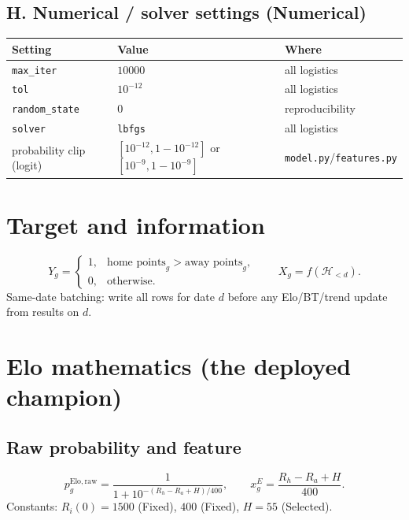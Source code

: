 \documentclass[10pt]{article}
\newcommand{\cls}[1]{\textbf{#1}}
\newcommand{\code}[1]{\texttt{#1}}
\begin{document}
\subsection{H. Numerical / solver settings (\cls{Numerical})}

\begin{longtable}{@{}lll@{}}
\toprule
\textbf{Setting} & \textbf{Value} & \textbf{Where} \\
\midrule
\endhead
\code{max\_iter} & \(10000\) & all logistics \\
\code{tol} & \(10^{-12}\) & all logistics \\
\code{random\_state} & \(0\) & reproducibility \\
\code{solver} & \code{lbfgs} & all logistics \\
probability clip (logit) & \([10^{-12},1-10^{-12}]\) or \([10^{-9},1-10^{-9}]\) & \code{model.py}/\code{features.py} \\
\bottomrule
\end{longtable}

\section{Target and information}

\[
Y_g=
\begin{cases}
1,&\text{home points}_g>\text{away points}_g,\\
0,&\text{otherwise.}
\end{cases}
\qquad
X_g=f(\mathcal{H}_{<d}).
\]
Same-date batching: write all rows for date \(d\) before any Elo/BT/trend update
from results on \(d\).

\section{Elo mathematics (the deployed champion)}
\label{sec:elo}

\subsection{Raw probability and feature}
\[
p_g^{\mathrm{Elo,raw}}
=
\frac{1}{1+10^{-(R_h-R_a+H)/400}},
\qquad
x_g^{E}
=
\frac{R_h-R_a+H}{400}.
\]
Constants: \(R_i(0)=1500\) (Fixed), \(400\) (Fixed), \(H=55\) (Selected).
\end{document}
